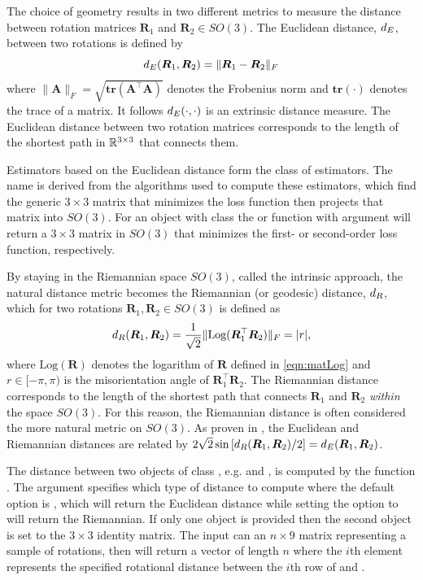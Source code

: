 The choice of geometry results in two different metrics to measure the distance between rotation matrices $\bm{R}_1$ and $\bm{R}_2 \in SO(3)$. The Euclidean distance, $d_E$, between two rotations is defined by
\begin{equation*}
d_E(\bm{R}_1,\bm{R}_2)=\|\bm{R}_1-\bm{R}_2\|_F
\end{equation*}
where $\|\bm{A}\|_F = \sqrt{\mathbf{tr}({\bm A^\top \bm A})}$ denotes the Frobenius norm and $\mathbf{tr}(\cdot)$ denotes the trace of a matrix.  It follows $d_E(\cdot,\cdot)$ is an extrinsic distance measure.  The Euclidean distance between two rotation matrices corresponds to the length of the shortest path in $\mathbb{R}^{3\times3}$ that connects them.  

Estimators based on the Euclidean distance form the class of  estimators.  The name is derived from the algorithms used to compute these estimators, which find the generic $3\times 3$ matrix that minimizes the loss function then projects that matrix into $SO(3)$.  For an object with class  the  or  function with argument  will return a $3\times 3$ matrix in $SO(3)$ that minimizes the first- or second-order loss function, respectively.

By staying in the Riemannian space $SO(3)$, called the intrinsic approach, the natural distance metric becomes the Riemannian (or geodesic) distance, $d_R$, which for two rotations $\bm{R}_1,\bm{R}_2\in SO(3)$  is  defined as 
\begin{equation*}
d_R(\bm{R}_1,\bm{R}_2)=  \frac{1}{\sqrt{2}}\|\text{Log}(\bm{R}_1^\top\bm{R}_2)\|_F = |r|,
\end{equation*}
where $\text{Log}(\bm{R})$ denotes the logarithm of $\bm{R}$ defined in \eqref{eqn:matLog} and $r\in[-\pi,\pi)$ is the misorientation angle of $\bm{R}_1^\top \bm{R}_2$.  The Riemannian distance corresponds to the length of the shortest path that connects $\bm{R}_1$ and $\bm{R}_2$ {\it within} the space $SO(3)$. For this reason, the Riemannian distance is often considered the more natural metric on $SO(3)$.  As proven in \cite{stanfill2013}, the Euclidean and Riemannian distances are related by $2\sqrt{2}\sin\left[d_R(\bm R_1,\bm R_2)/2\right]=d_E(\bm R_1,\bm R_2)$.

The distance between two objects of class , e.g.  and , is computed by the function .  The argument  specifies which type of distance to compute where the default option is , which will return the Euclidean distance while setting the option to  will return the Riemannian.  If only one object  is provided then the second object  is set to the $3\times3$ identity matrix.  The input  can an $n\times9$ matrix representing a sample of rotations, then  will return a vector of length $n$ where the $i$th element represents the specified rotational distance between the $i$th row of  and .

